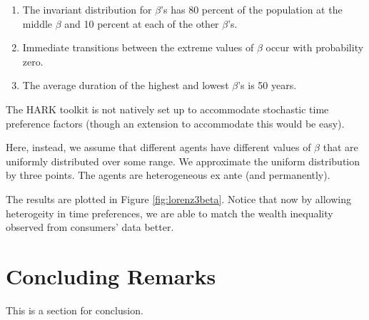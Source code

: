 \documentclass[titlepage]{\econtex}\providecommand{\texname}{KrusellSmithRep}%
\begin{document}
\begin{enumerate}
	
\item The invariant distribution for $\beta$'s has 80 percent of the population at the middle $\beta$ and 10 percent at each of the other $\beta$'s.
\item Immediate transitions between the extreme values of $\beta$ occur with probability zero. 
\item The average duration of the highest and lowest $\beta$'s is 50 years. 
\end{enumerate}

The HARK toolkit is not natively set up to accommodate stochastic time preference factors (though an extension to accommodate this would be easy).  

Here, instead, we assume that different agents have different values of $\beta$ that are uniformly distributed over some range. We approximate the uniform distribution by three points.  The agents are heterogeneous ex ante (and permanently).

The results are plotted in Figure \ref{fig:lorenz3beta}. Notice that now by allowing heterogeity in time preferences, we are able to match the wealth inequality observed from consumers' data better.  

\section{Concluding Remarks}

This is a section for conclusion. 


\normalsize



\end{document}
